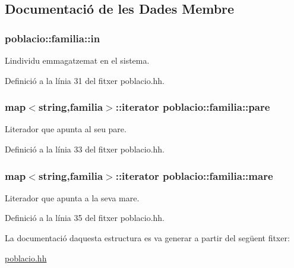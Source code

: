\subsection{Documentació de les Dades Membre}
\subsubsection[{\texorpdfstring{in}{in}}]{ poblacio\+::familia\+::in}\hypertarget{structpoblacio_1_1familia_a184e9fe52d7cf62ca133ac1d900f87ea}{}\label{structpoblacio_1_1familia_a184e9fe52d7cf62ca133ac1d900f87ea}


L\textquotesingle{}individu emmagatzemat en el sistema. 



Definició a la línia 31 del fitxer poblacio.\+hh.

\subsubsection[{\texorpdfstring{pare}{pare}}]{\setlength{\rightskip}{0pt plus 5cm}map$<$string,{\bf familia}$>$\+::iterator poblacio\+::familia\+::pare}\hypertarget{structpoblacio_1_1familia_af87f56b016ade8b4bb02a49036de5f74}{}\label{structpoblacio_1_1familia_af87f56b016ade8b4bb02a49036de5f74}


L\textquotesingle{}iterador que apunta al seu pare. 



Definició a la línia 33 del fitxer poblacio.\+hh.

\subsubsection[{\texorpdfstring{mare}{mare}}]{\setlength{\rightskip}{0pt plus 5cm}map$<$string,{\bf familia}$>$\+::iterator poblacio\+::familia\+::mare}\hypertarget{structpoblacio_1_1familia_a9d44bf543d7f856a93feac40de233c42}{}\label{structpoblacio_1_1familia_a9d44bf543d7f856a93feac40de233c42}


L\textquotesingle{}iterador que apunta a la seva mare. 



Definició a la línia 35 del fitxer poblacio.\+hh.



La documentació d\textquotesingle{}aquesta estructura es va generar a partir del següent fitxer\+:\begin{DoxyCompactItemize}
\item 
\hyperlink{poblacio_8hh}{poblacio.\+hh}\end{DoxyCompactItemize}
